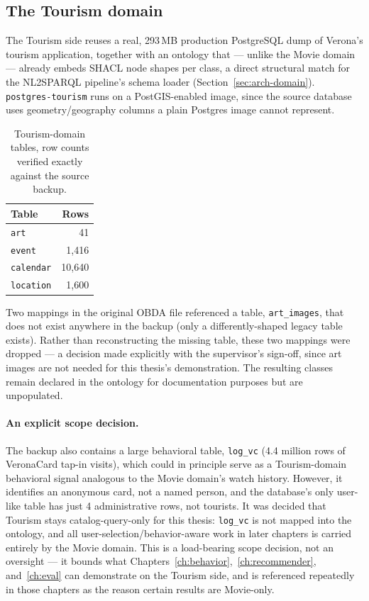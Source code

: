 \documentclass[11pt,a4paper,oneside]{book}
\newcommand{\code}[1]{\texttt{#1}}
\begin{document}
\subsection{The Tourism domain}

The Tourism side reuses a real, 293\,MB production PostgreSQL dump of Verona's tourism
application, together with an ontology that --- unlike the Movie domain --- already embeds SHACL
node shapes per class, a direct structural match for the NL2SPARQL pipeline's schema loader
(Section~\ref{sec:arch-domain}). \code{postgres-tourism} runs on a PostGIS-enabled image, since the
source database uses geometry/geography columns a plain Postgres image cannot represent.

\begin{table}[H]
\centering
\begin{tabular}{lr}
\toprule
\textbf{Table} & \textbf{Rows} \\
\midrule
\code{art}      & 41 \\
\code{event}    & 1{,}416 \\
\code{calendar} & 10{,}640 \\
\code{location} & 1{,}600 \\
\bottomrule
\end{tabular}
\caption{Tourism-domain tables, row counts verified exactly against the source backup.}
\label{tab:arch-tourism-tables}
\end{table}

Two mappings in the original OBDA file referenced a table, \code{art\_images}, that does not exist
anywhere in the backup (only a differently-shaped legacy table exists). Rather than reconstructing
the missing table, these two mappings were dropped --- a decision made explicitly with the
supervisor's sign-off, since art images are not needed for this thesis's demonstration. The
resulting classes remain declared in the ontology for documentation purposes but are unpopulated.

\paragraph{An explicit scope decision.} The backup also contains a large behavioral table,
\code{log\_vc} (4.4 million rows of VeronaCard tap-in visits), which could in principle serve as a
Tourism-domain behavioral signal analogous to the Movie domain's watch history. However, it
identifies an anonymous card, not a named person, and the database's only user-like table has just
4 administrative rows, not tourists. It was decided that Tourism stays catalog-query-only for this
thesis: \code{log\_vc} is not mapped into the ontology, and all user-selection/behavior-aware work
in later chapters is carried entirely by the Movie domain. This is a load-bearing scope decision,
not an oversight --- it bounds what Chapters~\ref{ch:behavior},~\ref{ch:recommender},
and~\ref{ch:eval} can demonstrate on the Tourism side, and is referenced repeatedly in those
chapters as the reason certain results are Movie-only.
\end{document}
